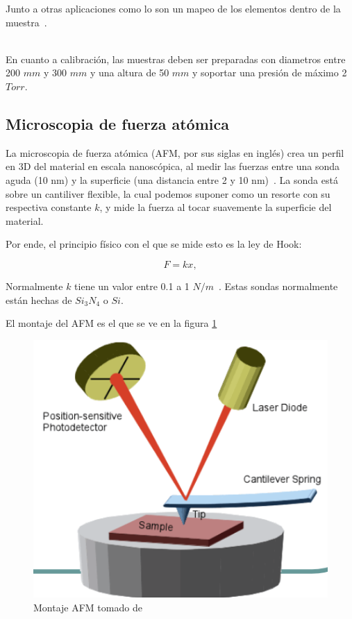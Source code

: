 \documentclass{article}
\begin{document}
Junto a otras aplicaciones como lo son un mapeo de los elementos dentro de la muestra~\cite{EDS}.\\\

En cuanto a calibración, las muestras deben ser preparadas con diametros entre 200 $mm$ y 300 $mm$ y una altura de 50 $mm$ y soportar una presión de máximo 2 $Torr$.

\subsection{Microscopia de fuerza atómica}

La microscopia de fuerza atómica (AFM, por sus siglas en inglés) crea un perfil en 3D del material en escala nanoscópica, al medir las fuerzas entre una sonda aguda (10 nm) y la superficie (una distancia entre 2 y 10 nm)~\cite{AFM}. La sonda está sobre un cantiliver flexible, la cual podemos suponer como un resorte con su respectiva constante $k$, y mide la fuerza al tocar suavemente la superficie del material.

Por ende, el principio físico con el que se mide esto es la ley de Hook:

\[F=kx,\]

Normalmente $k$ tiene un valor entre 0.1 a 1 $N/m$~\cite{AFM}. Estas sondas normalmente están hechas de $Si_3N_4$ o $Si$. 

El montaje del AFM es el que se ve en la figura \ref{AFM}

\begin{figure}
    \centering
    \includegraphics[scale=0.6]{Proyecto_final/Propuesta/AFM.png}
    \caption{Montaje AFM tomado de \cite{ClaseAFM}}
    \label{AFM}
\end{figure}
\end{document}
